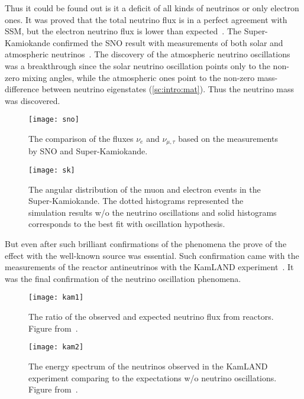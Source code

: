 \documentclass[../main.tex]{subfiles}
\begin{document}
Thus it could be found out is it a deficit of all kinds of neutrinos or only electron ones. It was proved that the total neutrino flux is in a perfect agreement with SSM, but the electron neutrino flux is lower than expected~\cite{Ahmad2002}. The Super-Kamiokande confirmed the SNO result with measurements of both solar and atmospheric neutrinos~\cite{Fukuda1999}. The discovery of the atmospheric neutrino oscillations was a breakthrough since the solar neutrino oscillation points only to the non-zero mixing angles, while the atmospheric ones point to the non-zero mass-difference between neutrino eigenstates (\autoref{sc:intro:mat}). Thus the neutrino mass was discovered.

\begin{figure}
  \centering
  \begin{minipage}{0.49\linewidth}
  \centering
    \texttt{[image: sno]}
    \caption{The comparison of the fluxes $\nu_e$ and $\nu_{\mu,\tau}$ based on the measurements by SNO and Super-Kamiokande.}
    \label{fig:intro:sno}
  \end{minipage}
  \begin{minipage}{0.49\linewidth}
  \centering
    \texttt{[image: sk]}
    \caption{The angular distribution of the muon and electron events in the Super-Kamiokande. The dotted histograms represented the simulation results w/o the neutrino oscillations and solid histograms corresponds to the best fit with oscillation hypothesis.}
    \label{fig:intro:sk}
  \end{minipage}
\end{figure}

But even after such brilliant confirmations of the phenomena the prove of the effect with the well-known source was essential. Such confirmation came with the measurements of the reactor antineutrinos with the KamLAND experiment~\cite{Eguchi2003}. It was the final confirmation of the neutrino oscillation phenomena.

\begin{figure}
  \centering
  \begin{minipage}{0.45\linewidth}
  \centering
    \texttt{[image: kam1]}
    \caption{The ratio of the observed and expected neutrino flux from reactors. Figure from~\cite{Eguchi2003}.}
    \label{fig:intro:kam1}
  \end{minipage}
  \begin{minipage}{0.45\linewidth}
  \centering
    \texttt{[image: kam2]}
    \caption{The energy spectrum of the neutrinos observed in the KamLAND experiment comparing to the expectations w/o neutrino oscillations. Figure from~\cite{Eguchi2003}.}
    \label{fig:intro:kam2}
  \end{minipage}
\end{figure}
\end{document}
